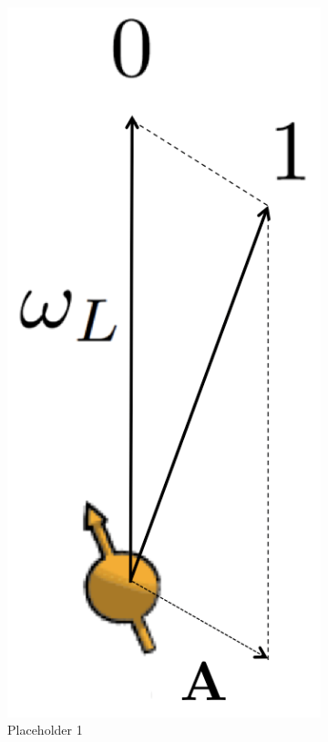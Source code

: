 \begin{figure}[htbp]
    \begin{subfigure}[t]{0.32\textwidth}\centering
    \includegraphics[scale=0.2]{Img/QuantizationAxis.png}
    \caption{Placeholder 1 }
    \end{subfigure}
    \begin{subfigure}[t]{0.32\textwidth}\centering

\end{subfigure}
\end{figure}
